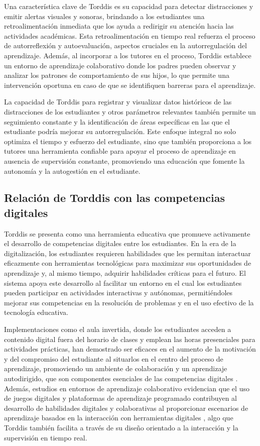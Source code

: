\documentclass[a4paper,fleqn]{cas-sc}
\begin{document}
			Una característica clave de Torddis es su capacidad para detectar distracciones y emitir alertas visuales y sonoras, brindando a los estudiantes una retroalimentación inmediata que los ayuda a redirigir su atención hacia las actividades académicas. Esta retroalimentación en tiempo real refuerza el proceso de autorreflexión y autoevaluación, aspectos cruciales en la autorregulación del aprendizaje. Además, al incorporar a los tutores en el proceso, Torddis establece un entorno de aprendizaje colaborativo donde los padres pueden observar y analizar los patrones de comportamiento de sus hijos, lo que permite una intervención oportuna en caso de que se identifiquen barreras para el aprendizaje.
			
			La capacidad de Torddis para registrar y visualizar datos históricos de las distracciones de los estudiantes y otros parámetros relevantes también permite un seguimiento constante y la identificación de áreas específicas en las que el estudiante podría mejorar su autorregulación. Este enfoque integral no solo optimiza el tiempo y esfuerzo del estudiante, sino que también proporciona a los tutores una herramienta confiable para apoyar el proceso de aprendizaje en ausencia de supervisión constante, promoviendo una educación que fomente la autonomía y la autogestión en el estudiante.
		
		\subsection{Relación de Torddis con las competencias digitales}
			Torddis se presenta como una herramienta educativa que promueve activamente el desarrollo de competencias digitales entre los estudiantes. En la era de la digitalización, los estudiantes requieren habilidades que les permitan interactuar eficazmente con herramientas tecnológicas para maximizar sus oportunidades de aprendizaje y, al mismo tiempo, adquirir habilidades críticas para el futuro. El sistema apoya este desarrollo al facilitar un entorno en el cual los estudiantes pueden participar en actividades interactivas y autónomas, permitiéndoles mejorar sus competencias en la resolución de problemas y en el uso efectivo de la tecnología educativa.
			
			Implementaciones como el aula invertida, donde los estudiantes acceden a contenido digital fuera del horario de clases y emplean las horas presenciales para actividades prácticas, han demostrado ser eficaces en el aumento de la motivación y del compromiso del estudiante al situarlos en el centro del proceso de aprendizaje, promoviendo un ambiente de colaboración y un aprendizaje autodirigido, que son componentes esenciales de las competencias digitales \citep{Mohamed2018Implementing}. Además, estudios en entornos de aprendizaje colaborativo evidencian que el uso de juegos digitales y plataformas de aprendizaje programado contribuyen al desarrollo de habilidades digitales y colaborativas al proporcionar escenarios de aprendizaje basados en la interacción con herramientas digitales \citep{Echeverria2011AFramework}, algo que Torddis también facilita a través de su diseño orientado a la interacción y la supervisión en tiempo real.
			
\end{document}
